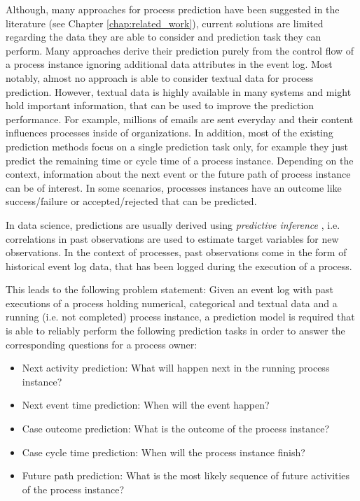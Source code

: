 Although, many approaches for process prediction have been suggested in the literature (see Chapter \ref{chap:related_work}), current solutions are limited regarding the data they are able to consider and prediction task they can perform.
Many approaches derive their prediction purely from the control flow of a process instance ignoring additional data attributes in the event log.
Most notably, almost no approach is able to consider textual data for process prediction.
However, textual data is highly available in many systems and might hold important information, that can be used to improve the prediction performance.
For example, millions of emails are sent everyday and their content influences processes inside of organizations. 
In addition, most of the existing prediction methods focus on a single prediction task only, for example they just predict the remaining time or cycle time of a process instance.
Depending on the context, information about the next event or the future path of process instance can be of interest.
In some scenarios, processes instances have an outcome like success/failure or accepted/rejected that can be predicted.

In data science, predictions are usually derived using \textit{predictive inference} \cite{predinf}, i.e. correlations in past observations are used to estimate target variables for new observations.
In the context of processes, past observations come in the form of historical event log data, that has been logged during the execution of a process.

This leads to the following problem statement:
Given an event log with past executions of a process holding numerical, categorical and textual data and a running (i.e. not completed) process instance, a prediction model is required that is able to reliably perform the following prediction tasks in order to answer the corresponding questions for a process owner:

\begin{itemize}
	\item Next activity prediction: What will happen next in the running process instance?
	\item Next event time prediction: When will the event happen?
	\item Case outcome prediction: What is the outcome of the process instance?
	\item Case cycle time prediction: When will the process instance finish?
	\item Future path prediction: What is the most likely sequence of future activities of the process instance?
\end{itemize}

